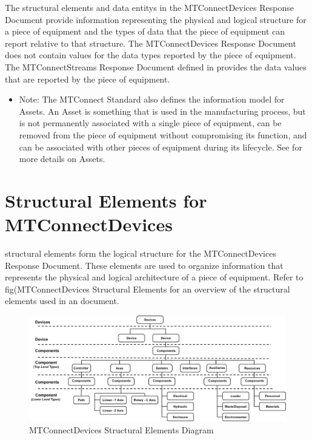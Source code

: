 The \glspl{structural element} and \glspl{data entity} in the \gls{MTConnectDevices Response Document} provide information representing the physical and logical structure for a piece of equipment and the types of data that the piece of equipment can report relative to that structure.   The \gls{MTConnectDevices Response Document} does not contain values for the data types reported by the piece of equipment.  The \gls{MTConnectStreams Response Document} defined in  provides the data values that are reported by the piece of equipment.


\begin{itemize}
    \item Note:  The \gls{MTConnect Standard} also defines the information model for \glspl{Asset}.  An \gls{Asset} is something that is used in the manufacturing process, but is not permanently associated with a single piece of equipment, can be removed from the piece of equipment without compromising its function, and can be associated with other pieces of equipment during its lifecycle.  See  for more details on \glspl{Asset}.

\end{itemize}


\section{Structural Elements for MTConnectDevices}
\label{sec:Structural Elements for MTConnectDevices}

\glspl{structural element} form the logical structure for the \gls{MTConnectDevices Response Document}.  These elements are used to organize information that represents the physical and logical architecture of a piece of equipment.  Refer to {{fig(MTConnectDevices Structural Elements}} for an overview of the \glspl{structural element} used in an  document.

\begin{figure}[ht]
  \centering
    \includegraphics[width=1.0\textwidth]{figures/MTConnectDevices Structural Elements.png}
  \caption{MTConnectDevices Structural Elements Diagram}
  \label{fig:MTConnectDevices Structural Elements Diagram}
\end{figure}

